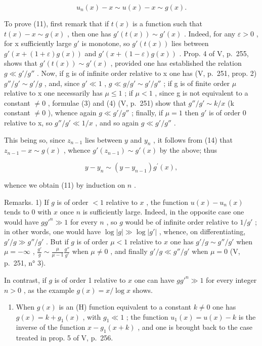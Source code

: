 \[
u _ {n} (x) - x \sim u (x) - x \sim g (x).\tag{14}
\]

To prove (11), first remark that if \(t(x)\) is a function such that \(t(x) - x \sim g(x)\) , then one has \(g'(t(x)) \sim g'(x)\) . Indeed, for any \(\varepsilon > 0\) , for x sufficiently large \(g'\) is monotone, so \(g'(t(x))\) lies between \(g'(x + (1 + \varepsilon)g(x))\) and \(g'(x + (1 - \varepsilon)g(x))\) . Prop. 4 of V, p.~255, shows that \(g'(t(x)) \sim g'(x)\) , provided one has established the relation \(g \ll g'/g''\) . Now, if g is of infinite order relative to x one has (V, p.~251, prop. 2) \(g''/g' \sim g'/g\) , and, since \(g' \ll 1\) , \(g \ll g/g' \sim g'/g''\) ; if g is of finite order \(\mu\) relative to x one necessarily has \(\mu \leqslant 1\) ; if \(\mu < 1\) , since g is not equivalent to a constant \(\neq 0\) , formulae (3) and (4) (V, p.~251) show that \(g''/g' \sim k/x\) (k constant \(\neq 0\) ), whence again \(g \ll g'/g''\) ; finally, if \(\mu = 1\) then \(g'\) is of order 0 relative to x, so \(g''/g' \ll 1/x\) , and so again \(g \ll g'/g''\) .

This being so, since \(z_{n-1}\) lies between \(y\) and \(y_n\) , it follows from (14) that \(z_{n-1} - x \sim g(x)\) , whence \(g'(z_{n-1}) \sim g'(x)\) by the above; thus

\[
y - y _ {n} \sim (y - y _ {n - 1}) g ^ {\prime} (x),
\]

whence we obtain (11) by induction on \(n\) .

Remarks. 1) If \(g\) is of order \(< 1\) relative to \(x\) , the function \(u(x) - u_n(x)\) tends to 0 with \(x\) once \(n\) is sufficiently large. Indeed, in the opposite case one would have \(gg'^n \gg 1\) for every \(n\) , so \(g\) would be of infinite order relative to \(1 / g'\) ; in other words, one would have \(\log |g| \gg \log |g'|\) , whence, on differentiating, \(g'/g \gg g''/g'\) . But if \(g\) is of order \(\mu < 1\) relative to \(x\) one has \(g'/g \sim g''/g'\) when \(\mu = -\infty\) , \(\frac{g'}{g} \sim \frac{\mu}{\mu - 1} \frac{g''}{g'}\) when \(\mu \neq 0\) , and finally \(g'/g \ll g''/g'\) when \(\mu = 0\) (V, p.~251, n° 3).

In contrast, if \(g\) is of order 1 relative to \(x\) one can have \(gg'^n \gg 1\) for every integer \(n > 0\) , as the example \(g(x) = x / \log x\) shows.

\begin{enumerate}
\def\labelenumi{\arabic{enumi})}
\setcounter{enumi}{1}
\tightlist
\item
  When \(g(x)\) is an (H) function equivalent to a constant \(k \neq 0\) one has \(g(x) = k + g_1(x)\) , with \(g_1 \ll 1\) ; the function \(u_1(x) = u(x) - k\) is the inverse of the function \(x - g_1(x + k)\) , and one is brought back to the case treated in prop. 5 of V, p.~256.
\end{enumerate}

